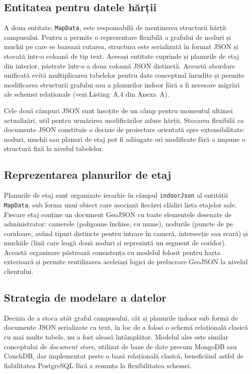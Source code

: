 \subsection{Entitatea pentru datele hărții}
\label{subsec:mapdata-entity}

A doua entitate, \texttt{MapData}, este responsabilă de menținerea structurii
hărții campusului. Pentru a permite o reprezentare flexibilă a grafului de
noduri și muchii pe care se bazează rutarea, structura este serializată în
format JSON și stocată într-o coloană de tip text. Aceeași entitate cuprinde
și planurile de etaj din interior, păstrate într-o a doua coloană JSON
distinctă. Această abordare unificată evită multiplicarea tabelelor pentru
date conceptual înrudite și permite modificarea structurii grafului sau a
planurilor indoor fără a fi necesare migrări ale schemei relaționale (vezi
Listing~A.4 din Anexa~A).

Cele două câmpuri JSON sunt însoțite de un câmp pentru momentul ultimei
actualizări, util pentru urmărirea modificărilor aduse hărții. Stocarea
flexibilă ca documente JSON constituie o decizie de proiectare orientată spre
extensibilitate: noduri, muchii sau planuri de etaj pot fi adăugate ori
modificate fără a impune o structură fixă la nivelul tabelelor.

\subsection{Reprezentarea planurilor de etaj}
\label{subsec:indoor-storage}

Planurile de etaj sunt organizate ierarhic în câmpul \texttt{indoorJson} al
entității \texttt{MapData}, sub forma unui obiect care asociază fiecărei
clădiri lista etajelor sale. Fiecare etaj conține un document GeoJSON cu
toate elementele desenate de administrator: camerele (poligoane închise, cu
nume), nodurile (puncte de pe coridoare, având tipuri distincte pentru
intrare în cameră, intersecție sau scară) și muchiile (linii care leagă două
noduri și reprezintă un segment de coridor). Această organizare păstrează
consistența cu modelul folosit pentru harta exterioară și permite reutilizarea
aceleiași logici de prelucrare GeoJSON la nivelul clientului.


\subsection{Strategia de modelare a datelor}
\label{subsec:strategie-date}
 
Decizia de a stoca atât graful campusului, cât și planurile indoor sub formă
de documente JSON serializate ca text, în loc de a folosi o schemă relațională
clasică cu mai multe tabele, nu a fost aleasă întâmplător.
Modelul ales este similar conceptului de \textit{document store}, utilizat de
baze de date precum MongoDB sau CouchDB, dar implementat peste o bază relațională
clasică, beneficiind astfel de fiabilitatea PostgreSQL fără a renunța la
flexibilitatea schemei.
 
